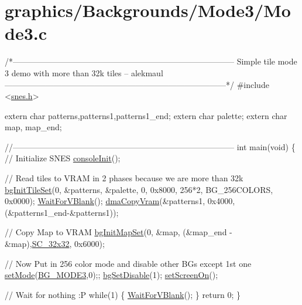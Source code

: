 \hypertarget{a00400}{}\section{graphics/\+Backgrounds/\+Mode3/\+Mode3.\+c}

\begin{DoxyCodeInclude}
\textcolor{comment}{/*---------------------------------------------------------------------------------}
\textcolor{comment}{}
\textcolor{comment}{}
\textcolor{comment}{    Simple tile mode 3 demo with more than 32k tiles}
\textcolor{comment}{    -- alekmaul}
\textcolor{comment}{}
\textcolor{comment}{}
\textcolor{comment}{---------------------------------------------------------------------------------*/}
\textcolor{preprocessor}{#include <\hyperlink{a00356}{snes.h}>}

\textcolor{keyword}{extern} \textcolor{keywordtype}{char} patterns,patterns1,patterns1\_end;
\textcolor{keyword}{extern} \textcolor{keywordtype}{char} palette;
\textcolor{keyword}{extern} \textcolor{keywordtype}{char} map, map\_end;

\textcolor{comment}{//---------------------------------------------------------------------------------}
\textcolor{keywordtype}{int} main(\textcolor{keywordtype}{void}) \{
    \textcolor{comment}{// Initialize SNES }
    \hyperlink{a00320_a6047713bb5a73afd3cd1d77e336bcdad}{consoleInit}();

    \textcolor{comment}{// Read tiles to VRAM in 2 phases because we are more than 32k}
    \hyperlink{a00317_ae09a7ac09be78eef0f28a6c7aabc82ad}{bgInitTileSet}(0, &patterns, &palette, 0, 0x8000, 256*2, BG\_256COLORS, 0x0000);
    \hyperlink{a00326_a815e2626bd26d0e936d507a363ecd723}{WaitForVBlank}();
    \hyperlink{a00323_aaf545b3f811f6ef4b7c4be434701a77a}{dmaCopyVram}(&patterns1, 0x4000, (&patterns1\_end-&patterns1));

    \textcolor{comment}{// Copy Map to VRAM}
    \hyperlink{a00317_acc385296e159449a81d18f5e219c8032}{bgInitMapSet}(0, &map, (&map\_end - &map),\hyperlink{a00317_a11724b6748ce0954e9b43819263537fc}{SC\_32x32}, 0x6000);

    \textcolor{comment}{// Now Put in 256 color mode and disable other BGs except 1st one}
    \hyperlink{a00353_afd9e46ae627d055dd8c98a4b0ebb73b1}{setMode}(\hyperlink{a00317_ab74253172bcb87b7947118b746ab2849}{BG\_MODE3},0);; \hyperlink{a00317_a4dbfb1b8854ff9ca4a7d11a899281bbb}{bgSetDisable}(1); 
    \hyperlink{a00353_abc7d4ef8ebc22f5b710927909bb3f144}{setScreenOn}();

    \textcolor{comment}{// Wait for nothing :P}
    \textcolor{keywordflow}{while}(1) \{
        \hyperlink{a00326_a815e2626bd26d0e936d507a363ecd723}{WaitForVBlank}();
    \}
    \textcolor{keywordflow}{return} 0;
\}
\end{DoxyCodeInclude}
 